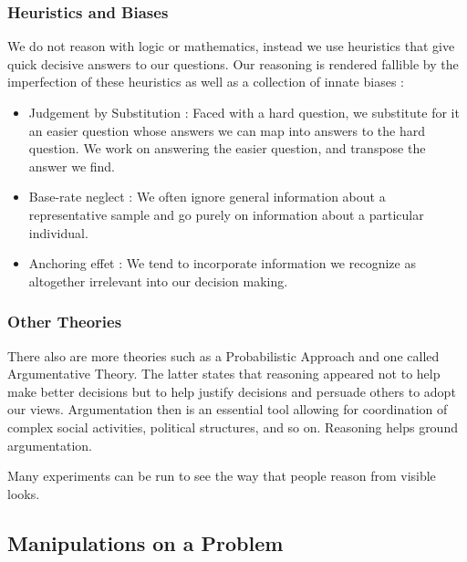 \documentclass{cours}
\begin{document}
\subsubsection{Heuristics and Biases}
We do not reason with logic or mathematics, instead we use heuristics that give quick decisive answers to our questions. Our reasoning is rendered fallible by the imperfection of these heuristics as well as a collection of innate biases : 
\begin{itemize}
    \item Judgement by Substitution : Faced with a hard question, we substitute for it an easier question whose answers we can map into answers to the hard question. We work on answering the easier question, and transpose the answer we find.
    \item Base-rate neglect : We often ignore general information about a representative sample and go purely on information about a particular individual.
    \item Anchoring effet : We tend to incorporate information we recognize as altogether irrelevant into our decision making. 
\end{itemize}

\subsubsection{Other Theories}
There also are more theories such as a Probabilistic Approach and one called Argumentative Theory. The latter states that reasoning appeared not to help make better decisions but to help justify decisions and persuade others to adopt our views. Argumentation then is an essential tool allowing for coordination of complex social activities, political structures, and so on. Reasoning helps ground argumentation. 


Many experiments can be run to see the way that people reason from visible looks. 

\subsection{Manipulations on a Problem}
\end{document}
